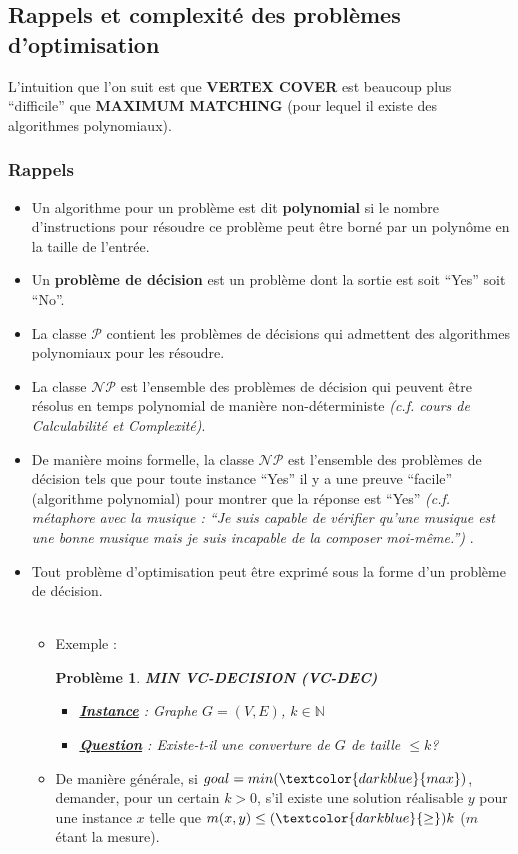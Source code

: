 \documentclass[12pt]{article}
\newcommand{\titre}[1]{\textcolor{title}{#1}}
\newcommand{\blu}[1]{\textcolor{darkblue}{#1}}
\newcommand{\N}{\mathbb{N}}
\newtheorem{pbm}{Problème}[section]
\begin{document}
\subsection{Rappels et complexité des problèmes d'optimisation}
L'intuition que l'on suit est que \textbf{VERTEX COVER} est beaucoup plus
``difficile'' que \textbf{MAXIMUM MATCHING} (pour lequel il existe des
algorithmes polynomiaux).

\subsubsection*{Rappels}

\begin{itemize}
\item Un algorithme pour un problème est dit \textbf{polynomial} si le nombre
d'instructions pour résoudre ce problème peut être borné par un polynôme en la
taille de l'entrée.
\item Un \textbf{problème de décision} est un problème dont la sortie est soit
``Yes'' soit ``No''.
\item La classe $\mathcal{P}$ contient les problèmes de décisions qui admettent
des algorithmes polynomiaux pour les résoudre.
\item La classe $\mathcal{NP}$ est l'ensemble des problèmes de décision qui
peuvent être résolus en temps polynomial de manière non-déterministe
\textit{(c.f. cours de Calculabilité et Complexité)}.
\item De manière moins formelle, la classe $\mathcal{NP}$ est l'ensemble des
problèmes de décision tels que pour toute instance ``Yes'' il y a une preuve
``facile'' (algorithme polynomial) pour montrer que la réponse est ``Yes''
\textit{(c.f. métaphore avec la musique : ``Je suis capable de vérifier qu'une
musique est une bonne musique mais je suis incapable de la composer moi-même.'')
}.
\item Tout problème d'optimisation peut être exprimé sous la forme d'un problème
de décision. \\$ $\\
\begin{itemize}
\item[$\rightarrow$] Exemple : \\
\indent \hbox{}
\begin{pbm}
\textbf{MIN VC-DECISION (\titre{VC-DEC})}
\begin{itemize}
\item[*]\textbf{\underline{Instance}} : Graphe $G=(V,E)$, $k \in \N$
\item[*]\textbf{\underline{Question}} : Existe-t-il une converture de $G$ de
taille $\leq k$?
\end{itemize}
\indent \hbox{}
\end{pbm}
\item[$\rightarrow$] De manière générale, si $goal=min(\blu{max})$, demander,
pour un certain $k>0$, s'il existe une solution réalisable
$y$ pour une instance $x$ telle que $m(x,y) \leq (\blu{\geq}) k$ ($m$ étant
la mesure).
\end{itemize}
\end{itemize}
\end{document}
